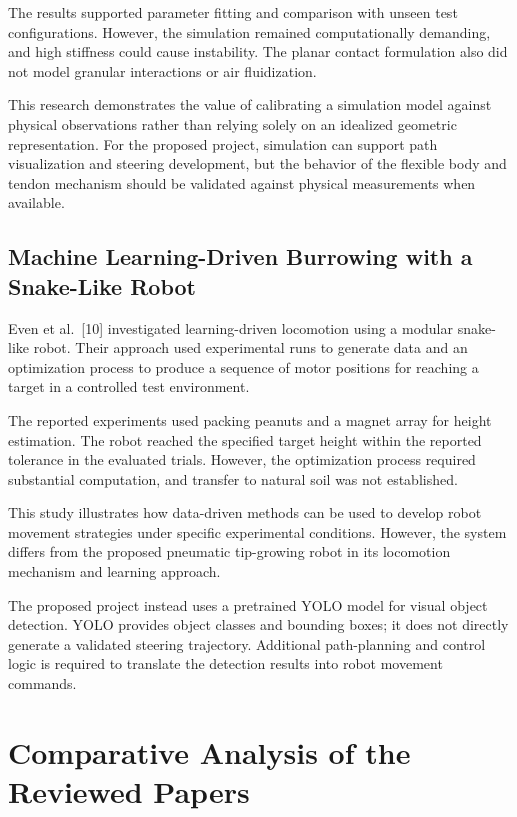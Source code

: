 The results supported parameter fitting and comparison with unseen test configurations. However, the simulation remained computationally demanding, and high stiffness could cause instability. The planar contact formulation also did not model granular interactions or air fluidization.

This research demonstrates the value of calibrating a simulation model against physical observations rather than relying solely on an idealized geometric representation. For the proposed project, simulation can support path visualization and steering development, but the behavior of the flexible body and tendon mechanism should be validated against physical measurements when available.

\subsection{Machine Learning-Driven Burrowing with a Snake-Like Robot}

Even et al.~[10] investigated learning-driven locomotion using a modular snake-like robot. Their approach used experimental runs to generate data and an optimization process to produce a sequence of motor positions for reaching a target in a controlled test environment.

The reported experiments used packing peanuts and a magnet array for height estimation. The robot reached the specified target height within the reported tolerance in the evaluated trials. However, the optimization process required substantial computation, and transfer to natural soil was not established.

This study illustrates how data-driven methods can be used to develop robot movement strategies under specific experimental conditions. However, the system differs from the proposed pneumatic tip-growing robot in its locomotion mechanism and learning approach.

The proposed project instead uses a pretrained YOLO model for visual object detection. YOLO provides object classes and bounding boxes; it does not directly generate a validated steering trajectory. Additional path-planning and control logic is required to translate the detection results into robot movement commands.

\section{Comparative Analysis of the Reviewed Papers}

